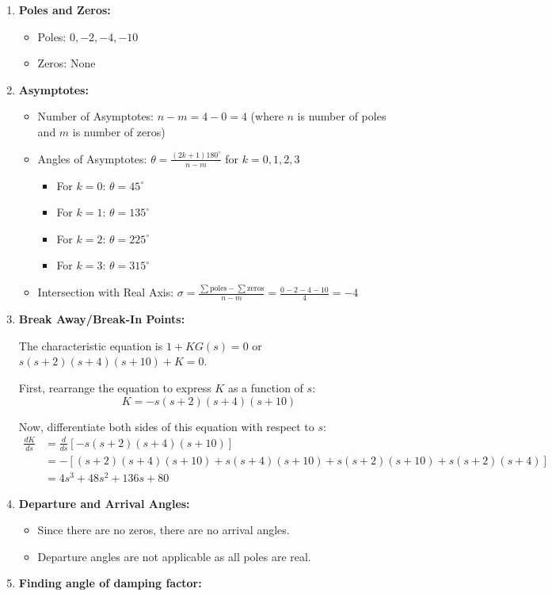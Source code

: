 \documentclass[11pt]{article}
\begin{document}
\begin{enumerate}
    \item \textbf{Poles and Zeros:}
    \begin{itemize}
        \item Poles: \( 0, -2, -4, -10 \)
        \item Zeros: None
    \end{itemize}

    \item \textbf{Asymptotes:}
    \begin{itemize}
        \item Number of Asymptotes: \( n - m = 4 - 0 = 4 \) (where \( n \) is number of poles and \( m \) is number of zeros)
        \item Angles of Asymptotes: \( \theta = \frac{(2k+1)180^\circ}{n-m} \) for \( k = 0, 1, 2, 3 \)
        \begin{itemize}
            \item For \( k = 0 \): \( \theta = 45^\circ \)
            \item For \( k = 1 \): \( \theta = 135^\circ \)
            \item For \( k = 2 \): \( \theta = 225^\circ \)
            \item For \( k = 3 \): \( \theta = 315^\circ \)
        \end{itemize}
        \item Intersection with Real Axis: \( \sigma = \frac{\sum \text{poles} - \sum \text{zeros}}{n - m} = \frac{0 - 2 - 4 - 10}{4} = -4 \)
    \end{itemize}

    \item \textbf{Break Away/Break-In Points:}

The characteristic equation is \( 1 + KG(s) = 0 \) or \( s(s+2)(s+4)(s+10) + K = 0 \).

First, rearrange the equation to express \( K \) as a function of \( s \):
\[ K = -s(s+2)(s+4)(s+10) \]

Now, differentiate both sides of this equation with respect to \( s \):
\begin{align*}
\frac{dK}{ds} &= \frac{d}{ds} \left[ -s(s+2)(s+4)(s+10) \right] \\
&= -\left[ (s+2)(s+4)(s+10) + s(s+4)(s+10) + s(s+2)(s+10) + s(s+2)(s+4)\right] \\
&= 4s^3+48s^2+136s+80
\end{align*}


    \item \textbf{Departure and Arrival Angles:}
    \begin{itemize}
        \item Since there are no zeros, there are no arrival angles.
        \item Departure angles are not applicable as all poles are real.
    \end{itemize}
    \item \textbf{Finding angle of damping factor:}
    

\end{enumerate}
\end{document}
